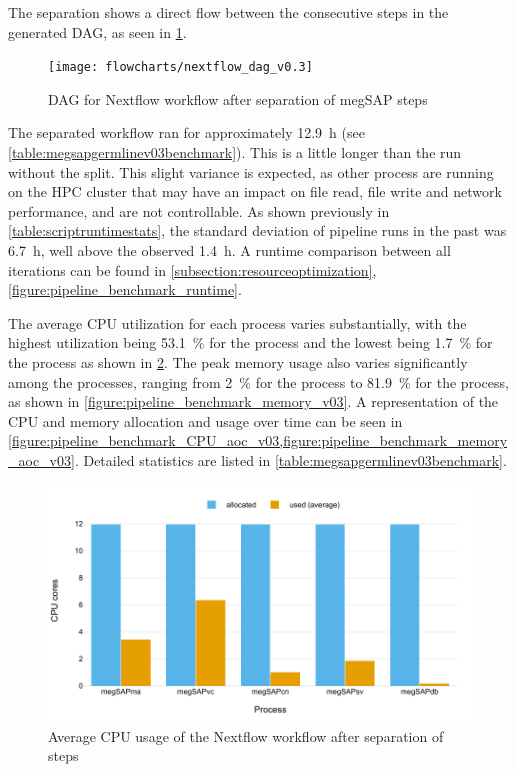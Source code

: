 The separation shows a direct flow between the consecutive steps in the generated \ac{DAG}, as seen in \cref{fig:dag_v03}.

\begin{figure}[H]
    \centering
	\texttt{[image: flowcharts/nextflow\_dag\_v0.3]}
	\caption{\Ac{DAG} for Nextflow workflow after separation of \acs{megSAP} steps}
	\label{fig:dag_v03}
\end{figure}

The separated workflow ran for approximately \SI{12.9}{\hour} (see \cref{table:megsapgermlinev03benchmark}). This is a little longer than the run without the split. This slight variance is expected, as other process are running on the \ac{HPC} cluster that may have an impact on file read, file write and network performance, and are not controllable. As shown previously in \cref{table:scriptruntimestats}, the standard deviation of pipeline runs in the past was \SI{6.7}{\hour}, well above the observed \SI{1.4}{\hour}. A runtime comparison between all iterations can be found in \cref{subsection:resourceoptimization}, \cref{figure:pipeline_benchmark_runtime}.

The average CPU utilization for each process varies substantially, with the highest utilization being \SI{53.1}{\percent} for the  process and the lowest being \SI{1.7}{\percent} for the  process as shown in \cref{figure:pipeline_benchmark_CPU_v03}. The peak memory usage also varies significantly among the processes, ranging from \SI{2}{\percent} for the  process to \SI{81.9}{\percent} for the  process, as shown in \cref{figure:pipeline_benchmark_memory_v03}. A representation of the CPU and memory allocation and usage over time can be seen in \cref{figure:pipeline_benchmark_CPU_aoc_v03,figure:pipeline_benchmark_memory_aoc_v03}. Detailed statistics are listed in \cref{table:megsapgermlinev03benchmark}.

\begin{figure}[H]
    \centering
	\includegraphics[width=\linewidth,height=\textheight,keepaspectratio]{pipeline_benchmark_CPU_v03}
	\caption{Average CPU usage of the Nextflow workflow after separation of steps}
	\label{figure:pipeline_benchmark_CPU_v03}
\end{figure}

